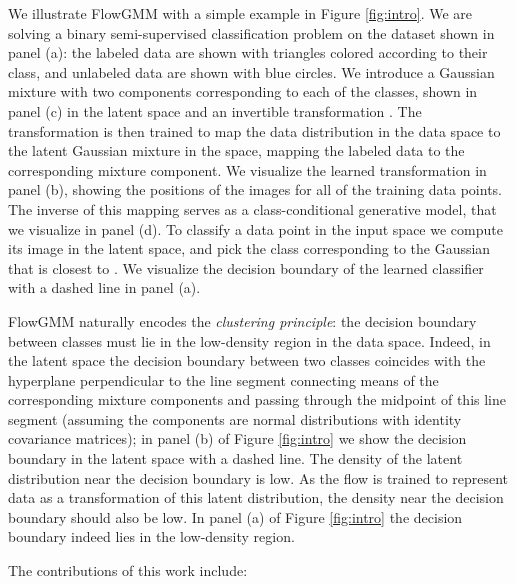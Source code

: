 \documentclass{article}
\newcommand{\method}{FlowGMM\xspace}
\begin{document}
We illustrate \method with a simple example in Figure \ref{fig:intro}.
We are solving a binary semi-supervised classification problem on the dataset shown 
in panel (a): the labeled data are shown with triangles colored according to their class, 
and unlabeled data are shown with blue circles. 
We introduce a Gaussian mixture with two components corresponding to each of the classes,
shown in panel (c) in the latent space  and an invertible transformation .
The transformation  is then trained to map the data distribution in the data space  to the latent Gaussian mixture in the  space, mapping the labeled data to the corresponding mixture component.
We visualize the learned transformation in panel (b), showing the positions of the images
 for all of the training data points.
The inverse  of this mapping serves as a class-conditional generative model, that we visualize in panel (d).
To classify a data point  in the input space we compute its image  in the latent space, and pick the class corresponding to the Gaussian that is closest to . 
We visualize the decision boundary of the learned classifier with a dashed line in panel (a).

\method naturally encodes the \textit{clustering principle}: the decision boundary
between classes must lie in the low-density region in the data space. 
Indeed, in the latent space
the decision boundary between two classes coincides with the hyperplane perpendicular to the line
segment connecting means of the corresponding mixture components and passing through the midpoint of this line segment (assuming the components are normal distributions with identity covariance matrices); in panel (b) of Figure \ref{fig:intro} we show the decision boundary in the latent space with a dashed line.
The density of the latent distribution near
the decision boundary is low. 
As the flow is trained to represent data as a transformation
of this latent distribution, the density near the decision boundary should
also be low. In panel (a) of Figure \ref{fig:intro} the decision
boundary indeed lies in the low-density region.



The contributions of this work include:
\end{document}
